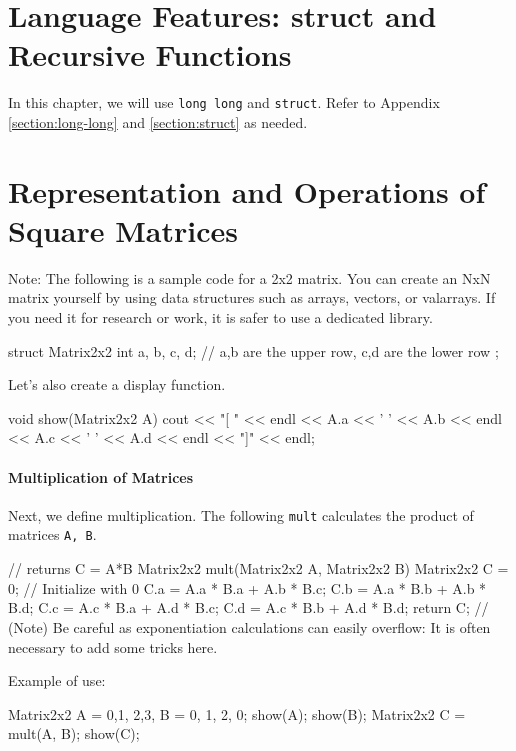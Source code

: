 \section{Language Features: struct and Recursive Functions}
In this chapter, we will use \texttt{long long} and \texttt{struct}.
Refer to Appendix \ref{section:long-long} and \ref{section:struct} as needed.

\section{Representation and Operations of Square Matrices}
Note: The following is a sample code for a 2x2 matrix. You can create an NxN matrix yourself by using data structures such as arrays, vectors, or valarrays. If you need it for research or work, it is safer to use a dedicated library.

\begin{cbox}
struct Matrix2x2 {
  int a, b, c, d; // a,b are the upper row, c,d are the lower row
};
\end{cbox}

Let's also create a display function.

\begin{cbox}
void show(Matrix2x2 A) { 
    cout << "[ " << endl
         << A.a << ' ' << A.b << endl
         << A.c << ' ' << A.d << endl
         << "]" << endl;
}
\end{cbox}

\paragraph{Multiplication of Matrices}
Next, we define multiplication. The following \texttt{mult} calculates the product of matrices \texttt{A, B}.

\begin{cbox}  
// returns C = A*B
Matrix2x2 mult(Matrix2x2 A, Matrix2x2 B) {
    Matrix2x2 C = {0}; // Initialize with 0
    C.a = A.a * B.a + A.b * B.c;
    C.b = A.a * B.b + A.b * B.d;
    C.c = A.c * B.a + A.d * B.c;
    C.d = A.c * B.b + A.d * B.d;
    return C;
}
// (Note) Be careful as exponentiation calculations can easily overflow: It is often necessary to add some tricks here.
\end{cbox}

Example of use:

\begin{cbox}
  Matrix2x2 A = {0,1, 2,3}, B = {0, 1, 2, 0};
  show(A);
  show(B);
  Matrix2x2 C = mult(A, B);
  show(C);
\end{cbox}

